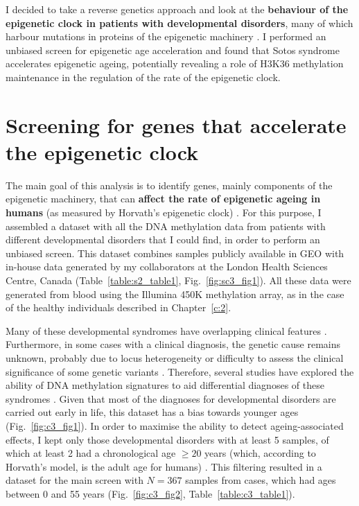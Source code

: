 \bigskip

I decided to take a reverse genetics approach and look at the \textbf{behaviour of the epigenetic clock in patients with developmental disorders}, many of which harbour mutations in proteins of the epigenetic machinery \cite{Aref-Eshghi2018,Bjornsson2015}. I performed an unbiased screen for epigenetic age acceleration and found that Sotos syndrome accelerates epigenetic ageing, potentially revealing a role of H3K36 methylation maintenance in the regulation of the rate of the epigenetic clock.

\smallskip

\section{Screening for genes that accelerate the epigenetic clock} \label{s:3.2}

\smallskip

The main goal of this analysis is to identify genes, mainly components of the epigenetic machinery, that can \textbf{affect the rate of epigenetic ageing in humans} (as measured by Horvath’s epigenetic clock) \cite{Horvath2013}. For this purpose, I assembled a dataset with all the DNA methylation data from patients with different developmental disorders that I could find, in order to perform an unbiased screen. This dataset combines samples publicly available in GEO \cite{Edgar2002} with in-house data generated by my collaborators at the London Health Sciences Centre, Canada (Table~\ref{table:s2_table1}, Fig.~\ref{fig:sc3_fig1}). All these data were generated from blood using the Illumina 450K methylation array, as in the case of the healthy individuals described in Chapter~\ref{c:2}.   

\bigskip

Many of these developmental syndromes have overlapping clinical features \cite{Aref-Eshghi2018, Bjornsson2015}. Furthermore, in some cases with a clinical diagnosis, the genetic cause remains unknown, probably due to locus heterogeneity or difficulty to assess the clinical significance of some genetic variants \cite{Aref-Eshghi2017}. Therefore, several studies have explored the ability of DNA methylation signatures to aid differential diagnoses of these syndromes \cite{Aref-Eshghi2018,Aref-Eshghi2017,Aref-Eshghi2018a,Butcher2017,Choufani2015,Schenkel2016,Alisch2013,Schenkel2017,Hood2016,Aldinger2013,Grafodatskaya2013,Kernohan2016}. Given that most of the diagnoses for developmental disorders are carried out early in life, this dataset has a bias towards younger ages (Fig.~\ref{fig:c3_fig1}). In order to maximise the ability to detect ageing-associated effects, I kept only those developmental disorders with at least 5 samples, of which at least 2 had a chronological age $\geq 20$ years (which, according to Horvath's model, is the adult age for humans) \cite{Horvath2013}. This filtering resulted in a dataset for the main screen with $N = 367$ samples from cases, which had ages between 0 and 55 years (Fig.~\ref{fig:c3_fig2}, Table~\ref{table:c3_table1}).

